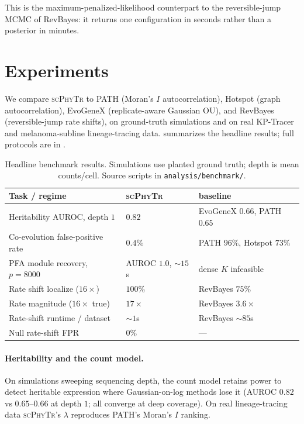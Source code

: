 \documentclass[11pt]{article}
\newcommand{\scphytr}{\textsc{scPhyTr}}
\begin{document}
This is the maximum-penalized-likelihood counterpart to the reversible-jump MCMC of RevBayes:
it returns one configuration in seconds rather than a posterior in minutes.

\section{Experiments}
\label{sec:experiments}

We compare \scphytr{} to PATH (Moran's $I$ autocorrelation), Hotspot (graph autocorrelation),
EvoGeneX (replicate-aware Gaussian OU), and RevBayes (reversible-jump rate shifts), on
ground-truth simulations and on real KP-Tracer and melanoma-subline lineage-tracing data.
 summarizes the headline results; full protocols are in .

\begin{table}[t]
\centering
\small
\begin{tabular}{@{}lll@{}}
\toprule
Task / regime & \scphytr{} & baseline \\
\midrule
Heritability AUROC, depth $1$ & $0.82$ & EvoGeneX $0.66$, PATH $0.65$ \\
Co-evolution false-positive rate & $0.4\%$ & PATH $96\%$, Hotspot $73\%$ \\
PFA module recovery, $p{=}8000$ & AUROC $1.0$, ${\sim}15$s & dense $K$ infeasible \\
Rate shift localize ($16\times$) & $100\%$ & RevBayes $75\%$ \\
Rate magnitude ($16\times$ true) & $17\times$ & RevBayes $3.6\times$ \\
Rate-shift runtime / dataset & ${\sim}1$s & RevBayes ${\sim}85$s \\
Null rate-shift FPR & $0\%$ & --- \\
\bottomrule
\end{tabular}
\caption{Headline benchmark results. Simulations use planted ground truth; depth is mean
counts/cell. Source scripts in \texttt{analysis/benchmark/}.}
\label{tab:results}
\end{table}

\paragraph{Heritability and the count model.} On simulations sweeping sequencing depth, the
count model retains power to detect heritable expression where Gaussian-on-log methods lose it
(AUROC $0.82$ vs $0.65$--$0.66$ at depth $1$; all converge at deep coverage). On real
lineage-tracing data \scphytr{}'s $\lambda$ reproduces PATH's Moran's $I$ ranking.
\end{document}

